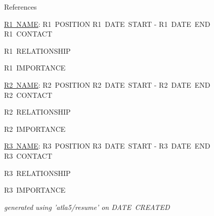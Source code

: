 \documentclass{resume} %
\begin{document}
  \begin{rSection}{References}

    \begin{rSubsection}{\underline{R1~NAME}: R1~POSITION }{ R1~DATE~START - R1~DATE~END }{R1~CONTACT}

      \item R1~RELATIONSHIP \newline

      \item R1~IMPORTANCE \newline

    \end{rSubsection}

    \begin{rSubsection}{\underline{R2~NAME}: R2~POSITION }{ R2~DATE~START - R2~DATE~END }{R2~CONTACT}

      \item R2~RELATIONSHIP \newline

      \item R2~IMPORTANCE \newline 

    \end{rSubsection}

    \begin{rSubsection}{\underline{R3~NAME}: R3~POSITION }{ R3~DATE~START - R3~DATE~END }{R3~CONTACT}

      \item R3~RELATIONSHIP \newline

      \item R3~IMPORTANCE \newline

    \end{rSubsection}

  \end{rSection}

  \begin{flushright}
    \em{generated using 'atla5/resume' on DATE~CREATED}
  \end{flushright}
\end{document}
